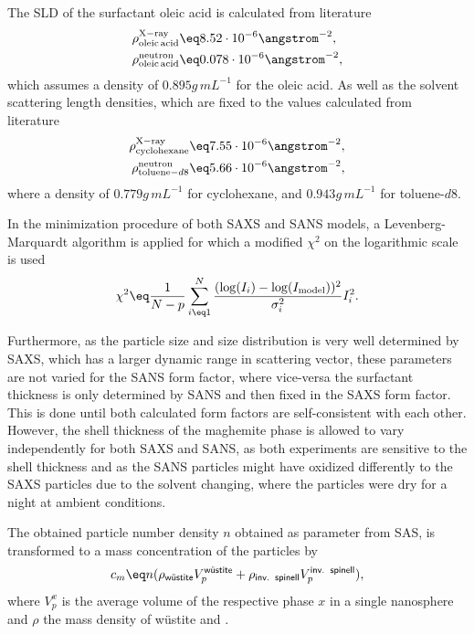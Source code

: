 \documentclass[\main/dresen_thesis.tex]{subfiles}
\begin{document}
    The SLD of the surfactant oleic acid is calculated from literature
    \begin{align}
      \rho^\mathrm{X-ray}_\mathrm{oleic\,acid} &\eq 8.52 \cdot 10^{-6} \angstrom^{-2},\\
      \rho^\mathrm{neutron}_\mathrm{oleic\,acid} &\eq 0.078 \cdot 10^{-6} \angstrom^{-2},
    \end{align}
    which assumes a density of $0.895 \unit{g\,mL^{-1}}$ for the oleic acid.
    As well as the solvent scattering length densities, which are fixed to the values calculated from literature
    \begin{align}
      \rho^\mathrm{X-ray}_{\mathrm{cyclohexane}} &\eq 7.55 \cdot 10^{-6} \angstrom^{-2},\\
      \rho^\mathrm{neutron}_{\mathrm{toluene-}d8}  &\eq 5.66 \cdot 10^{-6} \angstrom^{-2},
    \end{align}
    where a density of $0.779 \unit{g\,mL^{-1}}$ for cyclohexane, and $0.943 \unit{g\,mL^{-1}}$ for toluene-$\mathit{d8}$.

    In the minimization procedure of both SAXS and SANS models, a Levenberg-Marquardt algorithm\cite{Marquardt_1963_Analgo, Oliphant_2006_Guide} is applied for which a modified $\chi^2$ on the logarithmic scale is used
    \begin{align}
      \chi^2 \eq \frac{1}{N-p} \sum_{i\eq 1}^{N} \frac{(\log(I_i) - \log(I_\mathrm{model}))^2}{\sigma_i^2} I^2_i.
    \end{align}

    Furthermore, as the particle size and size distribution is very well determined by SAXS, which has a larger dynamic range in scattering vector, these parameters are not varied for the SANS form factor, where vice-versa the surfactant thickness is only determined by SANS and then fixed in the SAXS form factor.
    This is done until both calculated form factors are self-consistent with each other.
    However, the shell thickness of the maghemite phase is allowed to vary independently for both SAXS and SANS, as both experiments are sensitive to the shell thickness and as the SANS particles might have oxidized differently to the SAXS particles due to the solvent changing, where the particles were dry for a night at ambient conditions.

    The obtained particle number density $n$ obtained as parameter from SAS, is transformed to a mass concentration of the particles by
    \begin{align}
      c_m \eq n (\rho_\textsf{w\"ustite} V_p^\textsf{w\"ustite} + \rho_\textsf{inv.\, spinell} V_p^\textsf{inv.\, spinell}),
    \end{align}
    where $V^x_p$ is the average volume of the respective phase $x$ in a single nanosphere and $\rho$ the mass density of w\"ustite and .
\end{document}

